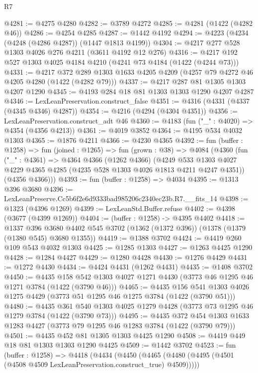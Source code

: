 \begin{lexlean}{R7}
\begin{coremodule}
@4281 := @4275 @4280
@4282 := @3789 @4272
@4285 := @4281 (@1422 (@4282 @46))
@4286 := @4254 @4285
@4287 := @1442 @4192
@4294 := @4223 (@4234 (@4248 (@4286 @4287)) (@1447 @1813 @4199))
@4304 := @4217 @277 @528 @1303 @4026 @276 @4211 (@3611 @4192 @12 @276)
@4316 := @4217 @192 @527 @1303 @4025 @4184 @4210 (@4241 @73 @4184 (@1422 (@4244 @73)))
@4331 := @4217
    @372
    @289
    @1303
    @1633
    @4205
    @4209
    (@4257 @79 @4272 @46 @4205 @4280 (@1422 (@4282 @79)))
@4337 := @4217 @287 @81 @1305 @1303 @4207 @1290
@4345 := @4193 @284 @18 @81 @1303 @1303 @1290 @4207 @4287
@4346 := LexLeanPreservation.construct_false
@4351 := @4316 (@4331 (@4337 (@4345 @4346) @4287))
@4354 := @4216 (@4294 (@4304 @4351))
@4356 := LexLeanPreservation.construct_adt @46
@4360 := @4183 (fun ("_" : @4020) => @4354 (@4356 @4213))
@4361 := @4019 @3852
@4364 := @4195 @534 @4032 @1303
@4365 := @1876 @4211
@4366 := @4230 @4365
@4392 := fun (buffer : @1258) =>
  fun (joined : @1265) =>
  fun (grown : @38) =>
  @4084
    (@4360
      (fun ("_" : @4361) =>
      @4364
        @4366
        (@1262 @4366)
        (@4249 @533 @1303 @4027 @4229 @4365 @4285 (@4235 @528 @1303 @4026 @1813 @4211 @4247 @4351))
        (@4356 @4366)))
@4393 := fun (buffer : @1258) => @4034
@4395 := @1313 @396 @3680
@4396 := LexLeanPreserve.Cc5b6f2e6d9333bad985206c2340ec23b.R7.__fits_14
@4398 := @1323 (@4396 @1269)
@4399 := LexLeanStd.Buffer.refuse
@4402 := @4398 (@3677 (@4399 @1269))
@4404 := (buffer : @1258) -> @4395 @4402
@4418 := @1337
    @396
    @3680
    @4402
    @545
    @3702
    (@1362 (@1372 @396))
    (@1378 (@1379 (@1380 @545) @3680 @1355))
@4419 := @1388 @3702
@4424 := @4419 @260 @109 @543 @4032 @1303
@4425 := @1285 @1303
@4427 := @1263 @4425 @1290
@4428 := @1284 @4427
@4429 := @1280 @4428
@4430 := @1276 @4429
@4431 := @1272 @4430
@4434 := @4424 @4431 (@1262 @4431)
@4435 := @1408 @3702
@4450 := @4435
    @158
    @542
    @1303
    @4027
    @1271
    @4430
    (@3773 @46 @1295 @46 @1271 @3784 (@1422 (@3790 @46)))
@4465 := @4435
    @156
    @541
    @1303
    @4026
    @1275
    @4429
    (@3773 @51 @1295 @46 @1275 @3784 (@1422 (@3790 @51)))
@4480 := @4435
    @361
    @540
    @1303
    @4025
    @1279
    @4428
    (@3773 @73 @1295 @46 @1279 @3784 (@1422 (@3790 @73)))
@4495 := @4435
    @372
    @454
    @1303
    @1633
    @1283
    @4427
    (@3773 @79 @1295 @46 @1283 @3784 (@1422 (@3790 @79)))
@4501 := @4435 @452 @81 @1305 @1303 @4425 @1290
@4508 := @4419 @449 @18 @81 @1303 @1303 @1290 @4425
@4509 := @1442 @3702
@4523 := fun (buffer : @1258) =>
  @4418
    (@4434
      (@4450 (@4465 (@4480 (@4495 (@4501 (@4508 @4509 LexLeanPreservation.construct_true) @4509)))))

\end{coremodule}
\end{lexlean}
